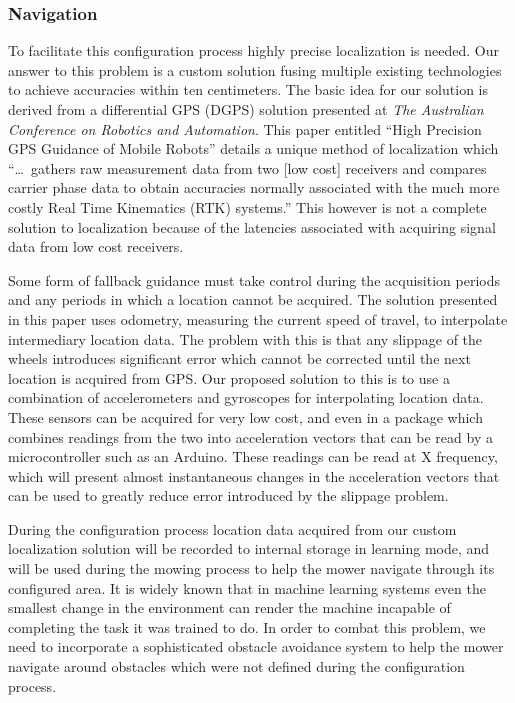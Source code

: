 \documentclass[12pt,letterpaper]{article}
\begin{document}
\subsubsection{Navigation}

To facilitate this configuration process highly precise localization is needed.
Our answer to this problem is a custom solution fusing multiple existing
technologies to achieve accuracies within ten centimeters.  The basic idea for
our solution is derived from a differential GPS (DGPS) solution presented at
\textit{The Australian Conference on Robotics and Automation}.  This paper
entitled ``High Precision GPS Guidance of Mobile Robots'' details a unique
method of localization which ``\ldots\ gathers raw measurement data from two
[low cost] receivers and compares carrier phase data to obtain accuracies
normally associated with the much more costly Real Time Kinematics (RTK)
systems.''\autocite{mobilegps}  This however is not a complete solution to
localization because of the latencies associated with acquiring signal data
from low cost receivers.  

Some form of fallback guidance must take control
during the acquisition periods and any periods in which a location cannot be
acquired.  The solution presented in this paper uses odometry, measuring the
current speed of travel, to interpolate intermediary location data.  The problem
with this is that any slippage of the wheels introduces significant error
which cannot be corrected until the next location is acquired from GPS.
Our proposed solution to this is to use a combination of accelerometers and
gyroscopes for interpolating location data.  These sensors can be acquired for
very low cost, and even in a package which combines readings from the two into
acceleration vectors that can be read by a microcontroller such as an Arduino. 
These readings can be read at X frequency, which will present almost
instantaneous changes in the acceleration vectors that can be used to greatly
reduce error introduced by the slippage problem.
  
During the configuration process location data acquired from our custom
localization solution will be recorded to internal storage in learning mode, and
will be used during the mowing process to help the mower navigate through its
configured area.  It is widely known that in machine learning systems even the
smallest change in the environment can render the machine incapable of
completing the task it was trained to do.  In order to combat this problem, we
need to incorporate a sophisticated obstacle avoidance system to help the mower
navigate around obstacles which were not defined during the configuration
process.
\end{document}
